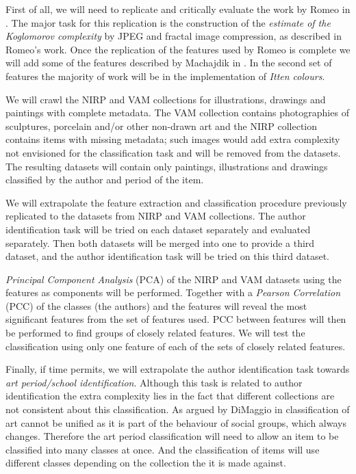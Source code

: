 \documentclass[a4paper]{article}
\begin{document}
First of all, we will need to replicate and critically evaluate the work by
Romeo in \cite{rmc12ajs}.  The major task for this replication is the
construction of the \emph{estimate of the Koglomorov complexity} by JPEG and
fractal image compression, as described in Romeo's work. Once the replication
of the features used by Romeo is complete we will add some of the features
described by Machajdik in \cite{mach10clas}.  In the second set of features the
majority of work will be in the implementation of \emph{Itten colours}.

We will crawl the NIRP and VAM collections for illustrations, drawings and
paintings with complete metadata.  The VAM collection contains photographies of
sculptures, porcelain and/or other non-drawn art and the NIRP collection
contains items with missing metadata; such images would add extra complexity
not envisioned for the classification task and will be removed from the
datasets.  The resulting datasets will contain only paintings, illustrations
and drawings classified by the author and period of the item.

We will extrapolate the feature extraction and classification procedure
previously replicated to the datasets from NIRP and VAM collections.  The
author identification task will be tried on each dataset separately and
evaluated separately.  Then both datasets will be merged into one to provide a
third dataset, and the author identification task will be tried on this third
dataset.

\emph{Principal Component Analysis} (PCA) of the NIRP and VAM datasets using
the features as components will be performed.  Together with a \emph{Pearson
Correlation} (PCC) of the classes (the authors) and the features will reveal
the most significant features from the set of features used.  PCC between
features will then be performed to find groups of closely related features.  We
will test the classification using only one feature of each of the sets of
closely related features.

Finally, if time permits, we will extrapolate the author identification task
towards \emph{art period/school identification}.  Although this task is related
to author identification the extra complexity lies in the fact that different
collections are not consistent about this classification.  As argued by
DiMaggio in \cite{dimaggio87art} classification of art cannot be unified as it
is part of the behaviour of social groups, which always changes.  Therefore the
art period classification will need to allow an item to be classified into many
classes at once.  And the classification of items will use different classes
depending on the collection the it is made against.
\end{document}
